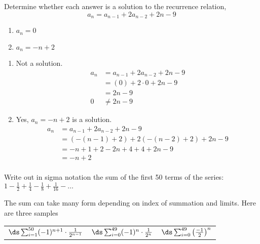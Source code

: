 \begin{questions}
 Determine whether each answer is a solution to the recurrence relation, 
$$ a_n = a_{n-1} + 2a_{n-2} + 2n - 9 $$
    \begin{enumerate}[label=(\alph*),topsep=0pt,itemsep=0pt,parsep=0pt]
        \item $a_n = 0$
        \item $a_n = -n +2$
    \end{enumerate}
    \ifprintanswers
        \vspace{-10pt}
    \fi
\begin{solution}
    \begin{enumerate}[label=(\alph*),topsep=0pt,itemsep=0pt,parsep=0pt]
        \item Not a solution.
        \begin{align*}
            a_n &= a_{n-1} + 2a_{n-2} + 2n - 9 \\
            &= (0) + 2\cdot0 + 2n - 9 \\
            &= 2n - 9 \\
            0 &\neq 2n - 9
        \end{align*}
        \item Yes, $a_n = -n + 2$ is a solution.
        \begin{align*}
            a_n &= a_{n-1} + 2a_{n-2} + 2n - 9 \\
            &= (-(n-1) + 2) + 2(-(n-2) + 2) + 2n -9 \\
            &= -n + 1 + 2 -2n + 4 + 4 + 2n -9 \\
            &= -n +2 \\
        \end{align*}
    \end{enumerate}
\end{solution}
   

 Write out in sigma notation the sum of the first 50 terms of the series: $1 - \frac{1}{2} + \frac{1}{4} - \frac{1}{8} + \frac{1}{16} - \ldots$
    \ifprintanswers
        \vspace{-10pt}
   \fi
\begin{solution}
    The sum can take many form depending on index of summation and limits.  Here are three samples
    
    \begin{center}
    \begin{tabular}{ccc}
        $\ds \sum_{i=1}^{50} (-1)^{n+1}\cdot\frac{1}{2^{n-1}}$ \hspace{0.25in}
        & $\ds \sum_{i=0}^{49} (-1)^{n}\cdot\frac{1}{2^{n}}$ \hspace{0.2in}
        & $\ds \sum_{i=0}^{49} \left(\frac{-1}{2}\right)^n$
    \end{tabular}
    \end{center}
\end{solution}  




\end{questions}
